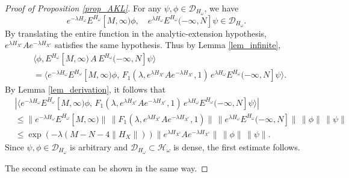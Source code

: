 \documentclass[11pt]{article}
\numberwithin{equation}{section}
\begin{document}
\begin{proof}[Proof of Proposition \ref{prop_AKL}]
For any $\psi,\phi\in\mathcal{D}_{H_\omega}$, we have
\[
e^{-\lambda H_\omega}E^{H_\omega}[M,\infty)\phi,\quad e^{\lambda H_\omega}E^{H_\omega}(-\infty,N] \psi\in\mathcal{D}_{H_\omega}.
\]
By translating the entire function in the analytic-extension hypothesis, $e^{\lambda H_{X^c}}Ae^{-\lambda H_{X^c}}$ satisfies the same hypothesis. Thus by Lemma \ref{lem_infinite},
\begin{align*}
&\langle\phi,E^{H_\omega}[M,\infty) \,A\,
E^{H_\omega}(-\infty,N]\psi\rangle\\
&=\langle e^{-\lambda H_\omega}E^{H_\omega}[M,\infty)\phi,\,
F_1(\lambda,e^{\lambda H_{X^c}}A e^{-\lambda H_{X^c}},1)\,
e^{\lambda H_\omega}E^{H_\omega}(-\infty,N] \psi\rangle.
\end{align*}
By Lemma \ref{lem_derivation}, it follows that
\begin{align*}
&|\langle e^{-\lambda H_\omega}E^{H_\omega}[M,\infty)\phi,\,
F_1(\lambda,e^{\lambda H_{X^c}}A e^{-\lambda H_{X^c}},1)\,
e^{\lambda H_\omega}
E^{H_\omega}(-\infty,N] \psi\rangle|\\
&\leq \|e^{-\lambda H_\omega}E^{H_\omega}[M,\infty)\|\,
\|F_1(\lambda,e^{\lambda H_{X^c}}A e^{-\lambda H_{X^c}},1)\|\,
\|e^{\lambda H_\omega} E^{H_\omega}(-\infty,N]\|
\,\|\phi\|\,\|\psi\|\\
&\leq \exp(-\lambda(M-N-4\|H_X\|)) \|e^{\lambda H_{X^c}}A e^{-\lambda H_{X^c}}\| \,\|\phi\|\,\|\psi\|.
\end{align*}
Since $\psi,\phi\in\mathcal{D}_{H_\omega}$ is arbitrary and $\mathcal{D}_{H_\omega}\subset\mathcal{H}_\omega$ is dense, the first estimate follows.

The second estimate can be shown in the same way.
\end{proof}
\end{document}
